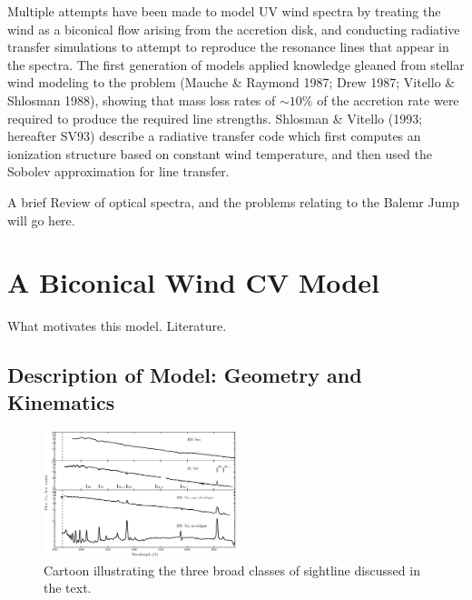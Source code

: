 \documentclass[preprint, a4paper, 11pt]{aastex}
\begin{document}
Multiple attempts have been made to model UV wind spectra by treating the wind
as a biconical flow arising from the accretion disk, and conducting radiative transfer simulations to attempt
to reproduce the resonance lines that appear in the spectra. The first generation of models
applied knowledge gleaned from stellar wind modeling to the problem (Mauche \& Raymond
1987; Drew 1987; Vitello \& Shlosman 1988), showing that mass loss rates of $\sim10\%$ of the accretion rate
 were required to produce the required line strengths.
Shlosman \& Vitello (1993; hereafter SV93) describe a radiative transfer code which first computes
an ionization structure based on constant wind temperature, and then used the Sobolev approximation
for line transfer.

A brief Review of optical spectra, and the problems relating to the Balemr Jump will go here.


\newpage
%
%

\section{A Biconical Wind CV Model}

What motivates this model. Literature. 

\subsection{Description of Model: Geometry and Kinematics}
\begin{figure}
\centering
\includegraphics[width=0.5\textwidth]{figures/fig1.eps}
\caption{Cartoon illustrating the three broad classes of sightline discussed in the text.}
\label{cartoon}
\end{figure}
\end{document}
